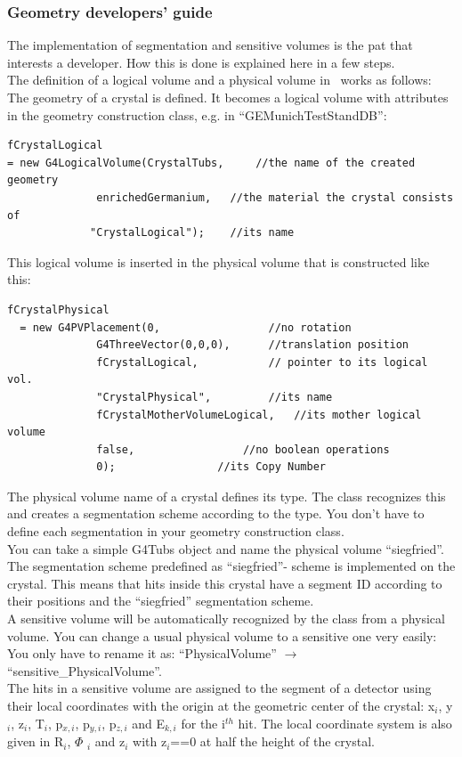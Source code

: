 \subsubsection{Geometry developers' guide}
The implementation of segmentation and sensitive volumes is the pat that interests a developer. How this is done is explained here in a few steps.\\
The definition of a logical volume and a physical volume in \mage \ works as follows:\\
The geometry of a crystal is defined. It becomes a logical volume with attributes in the geometry construction class, e.g. in ``GEMunichTestStandDB'':
\begin{lstlisting}
fCrystalLogical 
= new G4LogicalVolume(CrystalTubs,	   //the name of the created geometry
		      enrichedGermanium,   //the material the crystal consists of
		     "CrystalLogical");	   //its name
\end{lstlisting}
This logical volume is inserted in the physical volume that is constructed like this:
\begin{lstlisting}
fCrystalPhysical
  = new G4PVPlacement(0, 			     //no rotation
		      G4ThreeVector(0,0,0),	     //translation position
		      fCrystalLogical,		     // pointer to its logical vol.
		      "CrystalPhysical",	     //its name
		      fCrystalMotherVolumeLogical,   //its mother logical volume
		      false,			     //no boolean operations
		      0);			     //its Copy Number
\end{lstlisting}
The physical volume name of a crystal defines its type. The class recognizes this and creates a segmentation scheme according to the
type. You don't have to define each segmentation in your geometry construction class.\\
You can take a simple G4Tubs object and name the physical volume ``siegfried''. The segmentation scheme predefined as ``siegfried''- scheme is implemented on the crystal. This means that hits inside this crystal have a segment ID according to their positions and the ``siegfried'' segmentation scheme.\\
A sensitive volume will be automatically recognized by the class from a physical volume.
You can change a usual physical volume to a sensitive one very easily: You only have to rename it as: ``PhysicalVolume'' $\longrightarrow$ ``sensitive\_PhysicalVolume''.\\
The hits in a sensitive volume are assigned to the segment of a detector using their local coordinates with the origin at the geometric center of the crystal:  x$_i$, y$_i$, z$_i$, T$_i$, p$_{x,i}$, p$_{y,i}$, p$_{z,i}$ and E$_{k,i}$ for the i$^{th}$ hit. The local coordinate system is also given in R$_i$, $\Phi$ $_i$ and z$_i$ with z$_i$==0 at half the height of the crystal.\\
